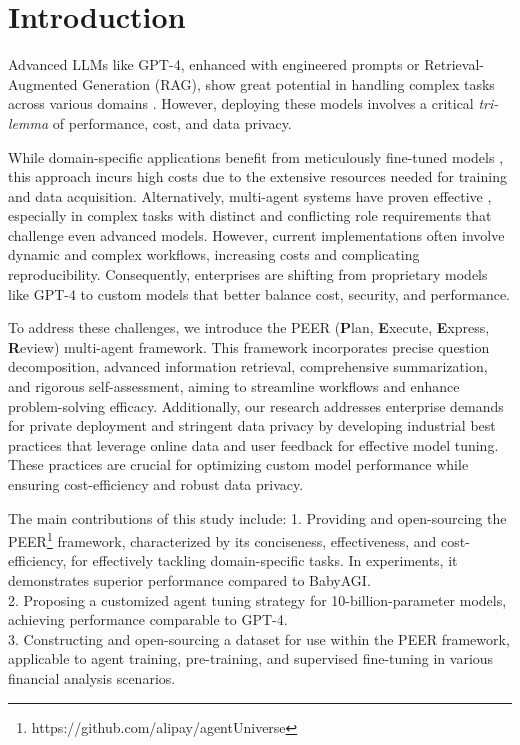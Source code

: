 \documentclass[11pt]{article}
\begin{document}
\section{Introduction}
Advanced LLMs like GPT-4, enhanced with engineered prompts or Retrieval-Augmented Generation (RAG), show great potential in handling complex tasks across various domains \cite{prompt-agent, med-prompt, rag-raft}. However, deploying these models involves a critical \textit{tri-lemma} of performance, cost, and data privacy.

While domain-specific applications benefit from meticulously fine-tuned models \cite{domain}, this approach incurs high costs due to the extensive resources needed for training and data acquisition. Alternatively, multi-agent systems have proven effective \cite{baby-agi,metagpt,camel,autogen,agent-survey}, especially in complex tasks with distinct and conflicting role requirements that challenge even advanced models. However, current implementations often involve dynamic and complex workflows, increasing costs and complicating reproducibility. Consequently, enterprises are shifting from proprietary models like GPT-4 to custom models that better balance cost, security, and performance.

To address these challenges, we introduce the PEER (\textbf{P}lan, \textbf{E}xecute, \textbf{E}xpress, \textbf{R}eview) multi-agent framework. This framework incorporates precise question decomposition, advanced information retrieval, comprehensive summarization, and rigorous self-assessment, aiming to streamline workflows and enhance problem-solving efficacy. Additionally, our research addresses enterprise demands for private deployment and stringent data privacy by developing industrial best practices that leverage online data and user feedback for effective model tuning. These practices are crucial for optimizing custom model performance while ensuring cost-efficiency and robust data privacy.

The main contributions of this study include:
1. Providing and open-sourcing the PEER\footnote{https://github.com/alipay/agentUniverse} framework, characterized by its conciseness, effectiveness, and cost-efficiency, for effectively tackling domain-specific tasks. In experiments, it demonstrates superior performance compared to BabyAGI.\\
2. Proposing a customized agent tuning strategy for 10-billion-parameter models, achieving performance comparable to GPT-4. \\
3. Constructing and open-sourcing a dataset for use within the PEER framework, applicable to agent training, pre-training, and supervised fine-tuning in various financial analysis scenarios.
\end{document}
